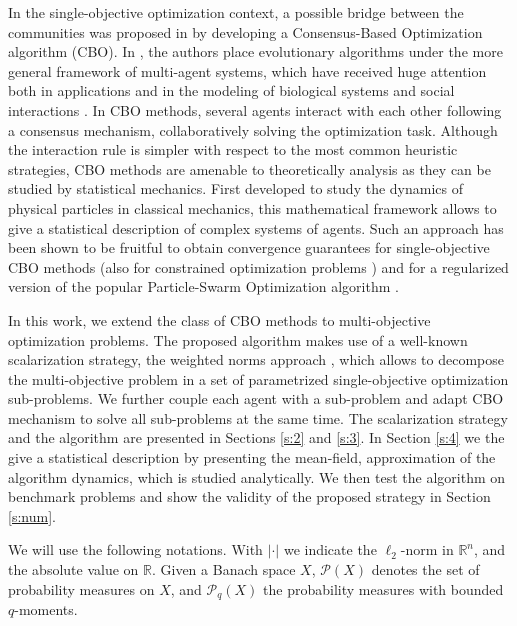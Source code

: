 \documentclass[letterpaper, 10 pt, conference]{ieeeconf}  %
\begin{document}
In the single-objective optimization context, a possible bridge between the communities was proposed in \cite{pinnau2017consensus} by developing a Consensus-Based Optimization algorithm (CBO). In \cite{pinnau2017consensus}, the authors place evolutionary algorithms under the more general framework of multi-agent systems, which have received huge attention both in applications \cite{dorri2918multiagents} and in the modeling of biological systems and social interactions \cite{pareschi13}. In CBO methods, several agents interact with each other following a consensus mechanism, collaboratively solving the optimization task. Although the interaction rule is simpler with respect to the most common heuristic strategies, CBO methods are amenable to theoretically analysis as they can be studied by statistical mechanics. First developed to study the dynamics of physical particles in classical mechanics, this mathematical framework allows to give a statistical description of complex systems of agents. Such an approach has been shown to be fruitful to obtain convergence guarantees for single-objective CBO methods \cite{fornasier2021consensusbased} (also for constrained optimization problems \cite{fornasier2020hypersurfaces,carrillo2021constrained,ha2022stochastic,borghi2021constrained}) and for a regularized version of the popular Particle-Swarm Optimization algorithm \cite{grassi2021from, huang2022PSO}. 

In this work, we extend the class of CBO methods to multi-objective optimization problems. The proposed algorithm makes use of a well-known scalarization strategy, the weighted norms approach \cite{book2005mop}, which allows to decompose the multi-objective problem in a set of parametrized single-objective optimization sub-problems. We further couple each agent with a sub-problem and adapt CBO mechanism to solve all sub-problems at the same time. The scalarization strategy and the algorithm are presented in Sections \ref{s:2} and \ref{s:3}. In Section \ref{s:4} we the give a statistical description by presenting the mean-field, approximation of the algorithm dynamics, which is studied analytically. We then test the algorithm on benchmark problems and show the validity of the proposed strategy in Section \ref{s:num}. 

We will use the following notations. With $| \cdot |$ we indicate the $\ell_2$-norm in $\mathbb{R}^n$, and the absolute value on $\mathbb{R}$. Given a Banach space $X$, $\mathcal{P}(X)$ denotes the set of probability measures on $X$, and $\mathcal{P}_q(X)$ the probability measures with bounded $q$-moments.
\end{document}
